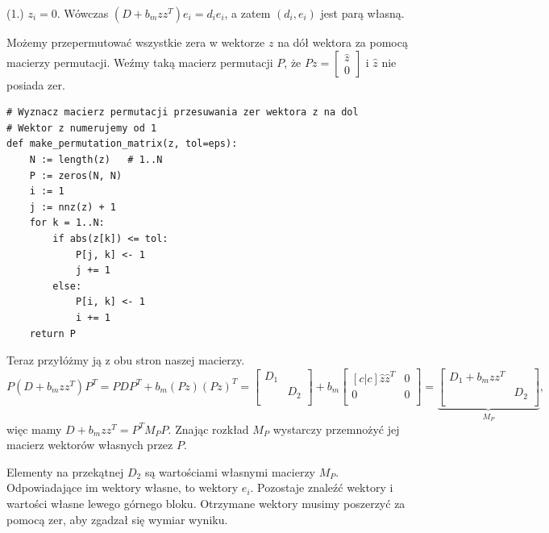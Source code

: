 \documentclass[a4paper,12pt]{article}
\begin{document}
(1.) $z_i = 0$. Wówczas $(D + b_m zz^T)e_i = d_i e_i$, a zatem $(d_i, e_i)$ jest parą własną.

Możemy przepermutować wszystkie zera w wektorze $z$ na dół wektora za pomocą macierzy permutacji.
Weźmy taką macierz permutacji $P$, że $Pz=\begin{bmatrix} \hat{z} \\ 0 \end{bmatrix}$ i $\hat{z}$ nie posiada zer.

\begin{lstlisting}
# Wyznacz macierz permutacji przesuwania zer wektora z na dol
# Wektor z numerujemy od 1
def make_permutation_matrix(z, tol=eps):
    N := length(z)   # 1..N
    P := zeros(N, N)
    i := 1
    j := nnz(z) + 1
    for k = 1..N:
        if abs(z[k]) <= tol:
            P[j, k] <- 1
            j += 1
        else:
            P[i, k] <- 1
            i += 1
    return P
\end{lstlisting}

Teraz przyłóżmy ją z obu stron naszej macierzy.
$$
    P ( D + b_m zz^T ) P^T =
    PDP^T + b_m (Pz)(Pz)^T =
    \begin{bmatrix}
        D_1 &     \\
            & D_2 \\
    \end{bmatrix}
    +
    b_m \begin{bmatrix}[c|c]
        \hat{z}\hat{z}^T & 0 \\
        \hline
        0                & 0 \\
    \end{bmatrix}
    =
    \underbrace{
        \begin{bmatrix}
            D_1 + b_m zz^T &     \\
                           & D_2 \\
        \end{bmatrix}
    }_{M_P},
$$
więc mamy $D + b_m zz^T = P^T M_P P$. Znając rozkład $M_P$ wystarczy przemnożyć
jej macierz wektorów własnych przez $P$.

Elementy na przekątnej $D_2$ są wartościami własnymi macierzy $M_P$.
Odpowiadające im wektory własne, to wektory $e_i$.
Pozostaje znaleźć wektory i wartości własne lewego górnego bloku. Otrzymane wektory
musimy poszerzyć za pomocą zer, aby zgadzał się wymiar wyniku.
\end{document}
